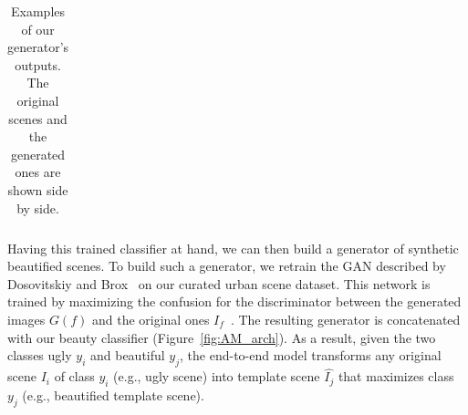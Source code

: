 \begin{table}
\begin{tabular}{l*2{C}@{}}
        \bottomrule 
    \end{tabular}
    \caption{Examples of our generator's outputs. The original scenes and the generated ones are shown side by side.}
    \label{fig:GanExample}
\end{table} 


Having this trained classifier at hand, we can then build a generator of synthetic beautified scenes. To build such a generator, we  retrain the GAN described by Dosovitskiy and Brox~\cite{dosovitskiy2016generating} on our curated urban scene dataset. This network is trained by maximizing the confusion for the discriminator between the generated images $G(f)$ and the original ones $I_f$~\cite{goodfellow2014generative}.  The resulting generator is concatenated with our beauty classifier (Figure~\ref{fig:AM_arch}). As a result, given the two classes ugly $y_i$ and beautiful $y_j$, the end-to-end model  transforms any original scene $I_i$ of class $y_i$ (e.g., ugly scene) into template scene $\hat{I_j}$ that maximizes class $y_j$ (e.g., beautified template scene). 

%
%

